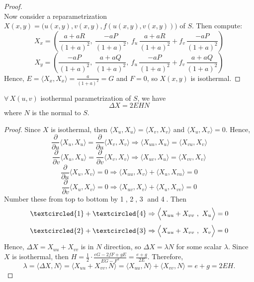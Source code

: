 \begin{proof}
\[\]
Now consider a reparametrization $X(x, y) = \big(u(x, y), v(x, y), f(u(x, y), v(x, y))\big)$ of $S$. Then compute:
\[
X_x = \left(\frac{a + aR}{(1 + a)^2},\ \frac{-aP}{(1 + a)^2},\ f_u\,\frac{a + aR}{(1 + a)^2} + f_v\,\frac{-aP}{(1 + a)^2}\right)
\]
\[
X_y = \left(\frac{-aP}{(1 + a)^2},\ \frac{a + aQ}{(1 + a)^2},\ f_u\,\frac{-aP}{(1 + a)^2} + f_v\,\frac{a + aQ}{(1 + a)^2}\right)
\]
Hence, $E = \big\langle X_x, X_x\big\rangle = \frac{a}{(1 + a)^2} = G$ and $F = 0$, so $X(x, y)$ is isothermal. 
\end{proof}

\begin{theorem}
$\forall\, X(u, v)$ isothermal parametrization of $S$, we have
\[
\Delta X = 2EHN
\]
where $N$ is the normal to $S$.
\end{theorem}

\begin{proof}
Since $X$ is isothermal, then $\big\langle X_u, X_u\big\rangle = \big\langle X_v, X_v\big\rangle$ and $\big\langle X_u, X_v\big\rangle = 0$. Hence,
\[
\frac{\partial}{\partial u}\big\langle X_u, X_u\big\rangle = \frac{\partial}{\partial u}\big\langle X_v, X_v\big\rangle \Rightarrow \big\langle X_{uu}, X_u\big\rangle = \big\langle X_{vu}, X_v\big\rangle
\]
\[
\frac{\partial}{\partial v}\big\langle X_u, X_u\big\rangle = \frac{\partial}{\partial v}\big\langle X_v, X_v\big\rangle \Rightarrow \big\langle X_{uv}, X_u\big\rangle = \big\langle X_{vv}, X_v\big\rangle
\]
\[
\frac{\partial}{\partial u}\big\langle X_u, X_v\big\rangle = 0 \Rightarrow \big\langle X_{uu}, X_v\big\rangle + \big\langle X_u, X_{vu}\big\rangle = 0
\]
\[
\frac{\partial}{\partial v}\big\langle X_u, X_v\big\rangle = 0 \Rightarrow \big\langle X_{uv}, X_v\big\rangle + \big\langle X_u, X_{vv}\big\rangle = 0
\]
Number these from top to bottom by \textcircled{1}, \textcircled{2}, \textcircled{3} and \textcircled{4}. Then
\[
\textcircled{1} + \textcircled{4} \Rightarrow \Big\langle X_{uu} + X_{vv}\ ,\ X_u\Big\rangle = 0
\]
\[
\textcircled{2} + \textcircled{3} \Rightarrow \Big\langle X_{uu} + X_{vv}\ ,\ X_v\Big\rangle = 0
\]
Hence, $\Delta X = X_{uu} + X_{vv}$ is in $N$ direction, so $\Delta X = \lambda N$ for some scalar $\lambda$. Since $X$ is isothermal, then $H = \frac{1}{2}\cdot\frac{eG - 2fF + gE}{EG - F^2} = \frac{e + g}{2E}$. Therefore,
\[
\lambda = \big\langle\Delta X, N\big\rangle = \big\langle X_{uu} + X_{vv}, N\big\rangle = \big\langle X_{uu}, N\big\rangle + \big\langle X_{vv}, N\big\rangle = e + g = 2EH.
\]
\end{proof}


